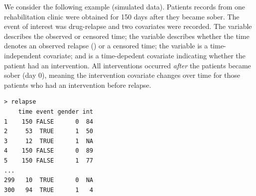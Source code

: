 \documentclass[11pt]{article}
\begin{document}
We consider the following example (simulated data). Patients records from one rehabilitation clinic were obtained for 150 days after they became sober. The event of interest was drug-relapse and two covariates were recorded. The  variable describes the observed or censored time; the  variable describes whether the time denotes an observed relapse () or a censored time; the  variable is a time-independent covariate; and  is a time-depedent covariate indicating whether the patient had an intervention. All interventions occurred \emph{after} the patients became sober (day 0), meaning the intervention covariate changes over time for those patients who had an intervention before relapse. %
\begin{verbatim}
> relapse
    time event gender int
1    150 FALSE      0  84
2     53  TRUE      1  50
3     12  TRUE      1  NA
4    150 FALSE      0  89
5    150 FALSE      1  77
...
299   10  TRUE      0  NA
300   94  TRUE      1   4
\end{verbatim}
\end{document}

